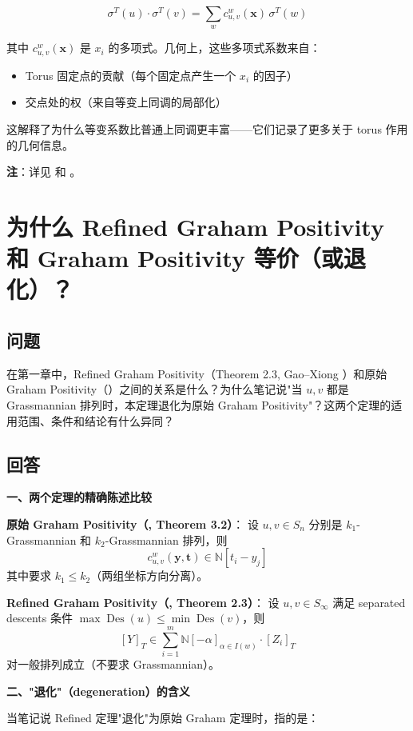 $$\sigma^T(u) \cdot \sigma^T(v) = \sum_w c_{u,v}^w(\mathbf{x}) \, \sigma^T(w)$$

其中 $c_{u,v}^w(\mathbf{x})$ 是 $x_i$ 的多项式。几何上，这些多项式系数来自：
\begin{itemize}
\item Torus 固定点的贡献（每个固定点产生一个 $x_i$ 的因子）
\item 交点处的权（来自等变上同调的局部化）
\end{itemize}

这解释了为什么等变系数比普通上同调更丰富——它们记录了更多关于 torus 作用的几何信息。

\textbf{注}：详见 \cite[Chapter 1]{macdonald1991} 和 \cite[Chapter 10]{FultonQuntum1997}。

\section{为什么 Refined Graham Positivity 和 Graham Positivity 等价（或退化）？}\label{sec:qa-RefinedEqualsGraham}
\subsection{问题}
在第一章中，Refined Graham Positivity（Theorem 2.3, Gao--Xiong \cite{GX2025}）和原始 Graham Positivity（\cite{Gr}）之间的关系是什么？为什么笔记说"当 $u, v$ 都是 Grassmannian 排列时，本定理退化为原始 Graham Positivity"？这两个定理的适用范围、条件和结论有什么异同？

\subsection{回答}

\textbf{一、两个定理的精确陈述比较}

\textbf{原始 Graham Positivity（\cite{Gr}, Theorem 3.2）}：
设 $u, v \in S_n$ 分别是 $k_1$-Grassmannian 和 $k_2$-Grassmannian 排列，则
$$c^w_{u,v}(\mathbf{y}, \mathbf{t}) \in \mathbb{N}[t_i - y_j]$$
其中要求 $k_1 \leq k_2$（两组坐标方向分离）。

\textbf{Refined Graham Positivity（\cite{GX2025}, Theorem 2.3）}：
设 $u, v \in S_\infty$ 满足 separated descents 条件 $\max\operatorname{Des}(u) \leq \min\operatorname{Des}(v)$，则
$$[Y]_T \in \sum_{i=1}^m \mathbb{N}[-\alpha]_{\alpha \in I(w)} \cdot [Z_i]_T$$
对一般排列成立（不要求 Grassmannian）。

\textbf{二、"退化"（degeneration）的含义}

当笔记说 Refined 定理"退化"为原始 Graham 定理时，指的是：

